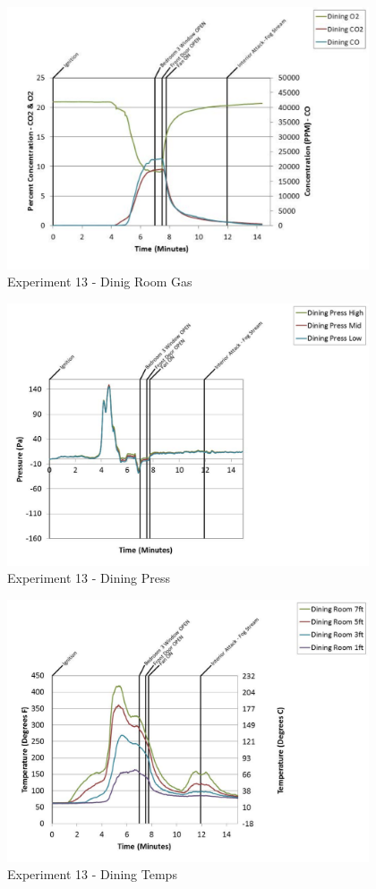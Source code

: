 \documentclass{article}
\begin{document}
\begin{appendices}
	\clearpage

	\begin{figure}[h!]
		\centering
		\includegraphics[height=3.05in]{0_Images/Results_Charts/Exp_13_Charts/DinigRoomGas.pdf}
		\caption{Experiment 13 - Dinig Room Gas}
	\end{figure}
 

	\begin{figure}[h!]
		\centering
		\includegraphics[height=3.05in]{0_Images/Results_Charts/Exp_13_Charts/DiningPress.pdf}
		\caption{Experiment 13 - Dining Press}
	\end{figure}
 
	\clearpage

	\begin{figure}[h!]
		\centering
		\includegraphics[height=3.05in]{0_Images/Results_Charts/Exp_13_Charts/DiningTemps.pdf}
		\caption{Experiment 13 - Dining Temps}
	\end{figure}
 


\end{appendices}
\end{document}
